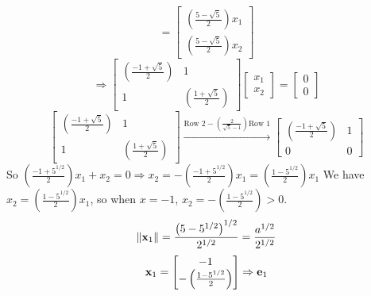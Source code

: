 \begin{enumerate}[font=\bfseries]
\[            =
            \begin{bmatrix}
                \left(\frac{5 - \sqrt{5}}{2}\right)x_1 \\
                \left(\frac{5 - \sqrt{5}}{2}\right)x_2
            \end{bmatrix}
        \]
        \[
            \Rightarrow
            \begin{bmatrix}
                \left(\frac{-1 + \sqrt{5}}{2}\right) & 1 \\
                1 & \left(\frac{1 + \sqrt{5}}{2}\right)
            \end{bmatrix}
            \begin{bmatrix}
                x_1 \\
                x_2
            \end{bmatrix}
            =
            \begin{bmatrix}
                0 \\
                0
            \end{bmatrix}
        \]
        \[
            \begin{bmatrix}
                \left(\frac{-1 + \sqrt{5}}{2}\right) & 1 \\
                1 & \left(\frac{1 + \sqrt{5}}{2}\right)
            \end{bmatrix}
            \overset{\text{Row 2} - \left(\frac{2}{\sqrt{5} - 1}\right)\text{Row 1}}{\longrightarrow}
            \begin{bmatrix}
                \left(\frac{-1 + \sqrt{5}}{2}\right) & 1 \\
                0 & 0
            \end{bmatrix}
        \]
        So $\left(\frac{-1 + 5^{1/2}}{2}\right)x_1 + x_2 = 0 \Rightarrow x_2 
        = -\left(\frac{-1 + 5^{1/2}}{2}\right)x_1 = \left(\frac{1 - 5^{1/2}}{2}\right)x_1$
        \newline
        We have $x_2 = \left(\frac{1 - 5^{1/2}}{2}\right)x_1$, so when $x = -1$, $x_2 = -\left(\frac{1 - 5^{1/2}}{2}\right) > 0$.
        \[
            {\left\|\bold{x}_1\right\|} = \frac{{\left(5 - 5^{1/2}\right)^{1/2}}}{2^{1/2}} = \frac{a^{1/2}}{2^{1/2}}
        \]
        \[
            \bold{x}_1
            =
            \begin{bmatrix}
                -1 \\
                -\left(\frac{1 - 5^{1/2}}{2}\right)
            \end{bmatrix}
            \Rightarrow
            \bold{e}_1
\]
\end{enumerate}

